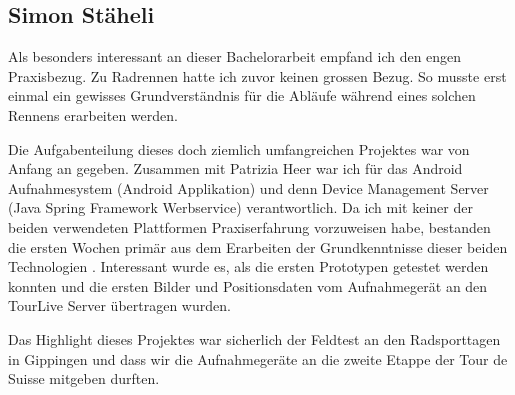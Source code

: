 \subsection{Simon Stäheli}
Als besonders interessant an dieser Bachelorarbeit empfand ich den engen Praxisbezug. Zu Radrennen hatte ich zuvor keinen grossen Bezug. So musste erst einmal ein gewisses Grundverständnis für die Abläufe während eines solchen Rennens erarbeiten werden. 

Die Aufgabenteilung dieses doch ziemlich umfangreichen Projektes war von Anfang an gegeben. Zusammen mit Patrizia Heer war ich für das Android Aufnahmesystem (Android Applikation) und denn Device Management Server (Java Spring Framework Werbservice) verantwortlich. Da ich mit keiner der beiden verwendeten Plattformen Praxiserfahrung vorzuweisen habe, bestanden die ersten Wochen primär aus dem Erarbeiten der  Grundkenntnisse dieser beiden Technologien \cite{beginningandroid2009}. Interessant wurde es, als die ersten Prototypen getestet werden konnten und die ersten Bilder und Positionsdaten vom Aufnahmegerät an den TourLive Server übertragen wurden.

Das Highlight dieses Projektes war sicherlich der Feldtest an den Radsporttagen in Gippingen und dass wir die Aufnahmegeräte an die zweite Etappe der Tour de Suisse mitgeben durften. 


